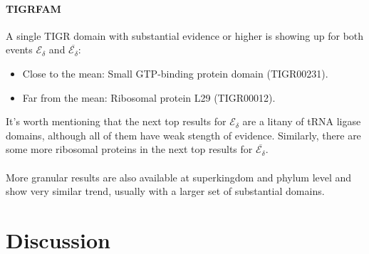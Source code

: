 \documentclass[12pt]{article}
\begin{document}
\paragraph{TIGRFAM}
A single TIGR domain with substantial evidence or higher is showing up for both events $\mathscr{E_{\delta}}$ and $\overline{\mathscr{E_{\delta}}}$:
%
\begin{itemize}
  \item Close to the mean: Small GTP-binding protein domain (TIGR00231).
  \item Far from the mean: Ribosomal protein L29 (TIGR00012).
\end{itemize}
%
It's worth mentioning that the next top results for $\mathscr{E_{\delta}}$ are a litany of tRNA ligase domains, although all of them have weak stength of evidence. Similarly, there are some more ribosomal proteins in the next top results for $\overline{\mathscr{E_{\delta}}}$.\\
\\
More granular results are also available at superkingdom and phylum level and show very similar trend, usually with a larger set of substantial domains.

\pagebreak

\section{Discussion}
\end{document}
